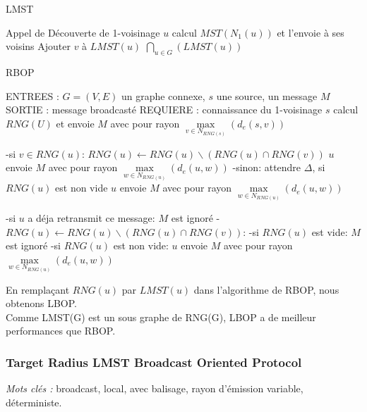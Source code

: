 \begin{algorithm}[h]
\caption{LMST}
\label{LMST}
\begin{algorithmic}
	\STATE Appel de Découverte de 1-voisinage
	\STATE $u$ calcul $MST(N_1(u))$ et l'envoie à ses voisins
\ENDFOR
{}
	    \STATE Ajouter $v$ à $LMST(u)$
	  \ENDIF
        \ENDFOR
\ENDFOR
\RETURN $\bigcap_{u \in G}( LMST(u))$
\end{algorithmic}
\end{algorithm}


\begin{algorithm}[H]
\caption{RBOP}
\label{algo_RBOP}
\begin{algorithmic}
\STATE ENTREES : $G=(V,E)$ un graphe connexe, $s$ une source, un message $M$
\STATE SORTIE : message broadcasté
\STATE REQUIERE : connaissance du 1-voisinage
\STATE $s$ calcul $RNG(U)$ et envoie $M$ avec pour rayon $\max\limits_{v\in N_{RNG(s)}}(d_e(s,v))$

		\STATE -si $v\in RNG(u)$: $RNG(u)\leftarrow RNG(u)\backslash(RNG(u)\cap RNG(v))$ $u$ envoie $M$ avec pour rayon $\max\limits_{w\in N_{RNG(u)}}(d_e(u,w))$
		\STATE -sinon: attendre $\Delta$, si $RNG(u)$ est non vide  $u$ envoie $M$ avec pour rayon $\max\limits_{w\in N_{RNG(u)}}(d_e(u,w))$
			 	
	\ENDIF
		\STATE -si $u$ a déja retransmit ce message: $M$ est ignoré
		\STATE -$RNG(u)\leftarrow RNG(u)\backslash(RNG(u)\cap RNG(v))$:
		\INDSTATE   -si $RNG(u)$ est vide: $M$ est ignoré
		\INDSTATE   -si $RNG(u)$ est non vide: $u$ envoie $M$ avec pour rayon $\max\limits_{w\in N_{RNG(u)}}(d_e(u,w))$
			 	
	\ENDIF

\ENDIF
\end{algorithmic}
\end{algorithm}

En remplaçant $RNG(u)$ par $LMST(u)$ dans l'algorithme de RBOP, nous obtenons LBOP.\\

Comme LMST(G) est un sous graphe de RNG(G), LBOP a de meilleur performances que RBOP.

\subsubsection{Target Radius LMST Broadcast Oriented Protocol \cite{Ingelrest2004}}
\emph{Mots clés :} broadcast, local, avec balisage, rayon d'émission variable, déterministe.

